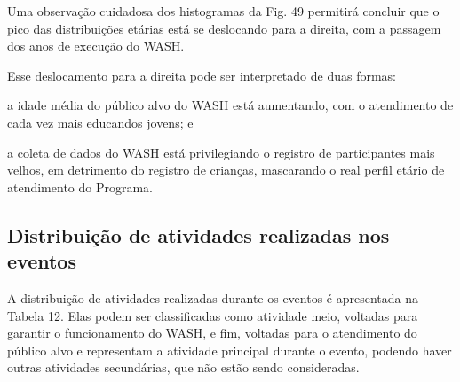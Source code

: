\documentclass[
12pt,		%
openright,	%
twoside,  %
a4paper,			%
chapter=TITLE,		%
english,			%
french,				%
spanish,			%
brazil				%
]{USPSC-classe/USPSC}
\begin{document}
Uma observa\c{c}\~ao cuidadosa dos histogramas da Fig. 49 permitir\'a concluir que o pico das distribui\c{c}\~oes et\'arias est\'a se deslocando para a direita, com a passagem dos anos de execu\c{c}\~ao do WASH.

















Esse deslocamento para a direita pode ser interpretado de duas formas:


















\begin{alineas}
\item a idade m\'edia do p\'ublico alvo do WASH est\'a aumentando, com o atendimento de cada vez mais educandos jovens; e
\item a coleta de dados do WASH est\'a privilegiando o registro de participantes mais velhos, em detrimento do registro de crian\c{c}as, mascarando o real perfil et\'ario de atendimento do Programa.
\end{alineas}

\subsection[Distribui\c{c}\~ao de atividades realizadas nos eventos]{Distribui\c{c}\~ao de atividades realizadas nos eventos}\label{Distribui\c{c}\~ao de atividades realizadas nos eventos}
A distribui\c{c}\~ao de atividades realizadas durante os eventos \'e apresentada na Tabela 12. Elas podem ser classificadas como \textquotedbl atividade meio\textquotedbl , voltadas para garantir o funcionamento do WASH, e \textquotedbl fim\textquotedbl , voltadas para o atendimento do p\'ublico alvo e representam a atividade principal durante o evento, podendo haver outras atividades secund\'arias, que n\~ao est\~ao sendo consideradas.
\end{document}
